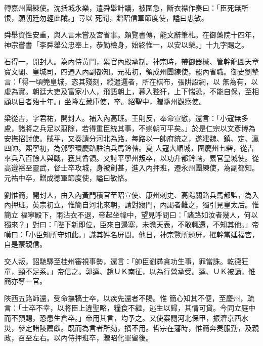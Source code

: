 \begin{pinyinscope}
 轉嘉州團練使。沈括城永樂，遣舜舉計議，被圍急，斷衣襟作奏曰：「臣死無所恨，願朝廷勿輕此賊。」尋以
 死聞，贈昭信軍節度使，謚曰忠敏。



 舜舉資性安重，與人言未嘗及宮省事。頗覽書傳，能文辭筆札。在御藥院十四年，神宗嘗書「李舜舉公忠奉上，恭勤檢身，始終惟一，以安以榮。」十九字賜之。



 石得一，開封人。為內侍黃門，累官內殿承制。神宗時，帶御器械、管幹龍圖天章寶文閣、皇城司，四遷入內副都知。元祐初，領成州團練使，罷內省職。御史劉摯言：「得一頃筦皇城，恣其殘刻，縱遣邏者，所在棋布，張阱設網，以
 無為有，以虛為實。朝廷大吏及富家小人，飛語朝上，暮入狴犴，上下惴恐，不能自保，至相顧以目者殆十年。」坐降左藏庫使，卒。紹聖中，贈隨州觀察使。



 梁從吉，字君祐，開封人。補入內高班。王則反，奉命宣慰，還言：「小寇無多慮，諸將之兵足以翦除，若得重臣統其事，不崇朝可平矣。」於是仁宗以文彥博為安撫招討使。賊平，又奏請分河北為路，每路以一帥府統之，遂建魏、鎮、定、瀛四帥。熙寧初，為邠寧環慶路駐泊兵馬鈐轄。夏
 人寇大順城，圍慶州七砦，從吉率兵八百餘人與戰，獲其酋領。又討平寧州叛卒，以功升都鈐轄，累官皇城使。從高遵裕至靈武，督士卒攻城，身被創甚，進入內押班，遷永州團練使，為副都知。元祐中卒，贈成德軍節度使，謚曰敏恪。



 劉惟簡，開封人，由入內黃門積官至昭宣使、康州刺史、高陽關路兵馬都監，為入內押班。英宗初立，惟簡自河北來朝，請對寢門，內謁者難之，獨引見皇太后。惟簡立
 福寧殿下，雨沾衣不退，帝起坐幃中，望見呼問曰：「諸路如汝者幾人，何以獨來？」對曰：「陛下新即位，臣來自邊塞，未瞻天表，不敢輒還，不知其他。」帝嘆曰：「小臣知所守如此。」識其姓名屏間。他日，神宗覽所題屏，擢幹當延福宮，自是蒙親信。



 交人叛，詔馳驛至桂州審視事勢，還言：「帥臣劉彞貪功生事，罪當誅。乾德狂童，頸不足系。」帝信之。郭逵、趙ＵＫ南征，以為行營承受。逵、ＵＫ被謫，惟簡亦奪一官。



 陜西五路師還，受命撫犒士卒，以疾先還者不賜。惟
 簡心知其不便，至慶州，疏言：「士卒不幸，以將臣上違聖略，糧食不繼，逃生以歸，其情可貸。今同立庭中而不預賜，恐患生倉卒。」帝用其言，均予之。又使案閱河北保甲，振濟京西水災，參定諸陵薦獻。既而為言者所劾，擯不用。哲宗在藩時，惟簡奔奏服勤，及親政，召至左右。以內侍押班卒，贈昭化軍留後。



\end{pinyinscope}